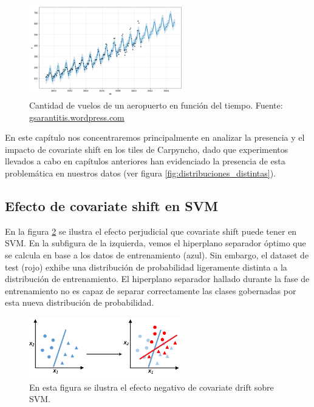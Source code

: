 \begin{figure}[h!]
\centering
  \includegraphics[width=0.6\textwidth]{Kap8/concept-drift.png}  
\caption{Cantidad de vuelos de un aeropuerto en función del tiempo. Fuente: \url{gsarantitis.wordpress.com}}
\label{fig:concept_drift}
\end{figure}

En este capítulo nos concentraremos principalmente en analizar la presencia y el impacto de covariate shift en los tiles de Carpyncho, dado que experimentos llevados a cabo en capítulos anteriores han evidenciado la presencia de esta problemática en nuestros datos (ver figura \ref{fig:distribuciones_distintas}).


\subsection{Efecto de covariate shift en SVM}

En la figura \ref{fig:svm_afectado} se ilustra el efecto perjudicial que covariate shift puede tener en SVM. En la subfigura de la izquierda, vemos el hiperplano separador óptimo que se calcula en base a los datos de entrenamiento (azul). Sin embargo, el dataset de test (rojo) exhibe una distribución de probabilidad ligeramente distinta a la distribución de entrenamiento. El hiperplano separador hallado durante la fase de entrenamiento no es capaz de separar correctamente las clases gobernadas por esta nueva distribución de probabilidad. \\


\begin{figure}[h!]
\centering
  \includegraphics[width=0.6\textwidth]{Kap8/svm_afectado.png}  
\caption{En esta figura se ilustra el efecto negativo de covariate drift sobre SVM.}
\label{fig:svm_afectado}
\end{figure}

